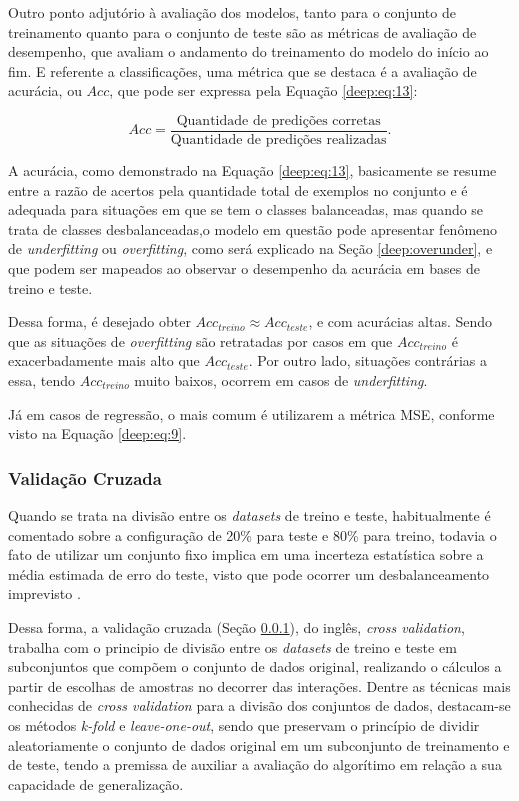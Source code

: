 Outro ponto adjutório à avaliação dos modelos, tanto para o conjunto de treinamento quanto para o conjunto de teste são as métricas de avaliação de desempenho, que avaliam o andamento do treinamento do modelo do início ao fim. E referente a classificações, uma métrica que se destaca é a avaliação de acurácia, ou $Acc$, que pode ser expressa pela Equação \ref{deep:eq:13}:

\begin{equation}
    \label{deep:eq:13}
    Acc = \frac{\text{Quantidade de predições corretas}}{\text{Quantidade de predições realizadas}}.
\end{equation}

A acurácia, como demonstrado na Equação \ref{deep:eq:13}, basicamente se resume entre a razão de acertos pela quantidade total de exemplos no conjunto e é adequada para situações em que se tem o classes balanceadas, mas quando se trata de classes desbalanceadas,o modelo em questão pode apresentar fenômeno de \textit{underfitting} ou \textit{overfitting}, como será explicado na Seção \ref{deep:overunder}, e que podem ser mapeados ao observar o desempenho da acurácia em bases de treino e teste.

Dessa forma, é desejado obter $Acc_{treino} \approx Acc_{teste}$, e com  acurácias altas. Sendo que as situações de \textit{overfitting} são retratadas por casos em que $Acc_{treino}$ é exacerbadamente mais alto que $Acc_{teste}$. Por outro lado, situações contrárias a essa, tendo $Acc_{treino}$ muito baixos, ocorrem em casos de \textit{underfitting}.

Já em casos de regressão, o mais comum é utilizarem a métrica MSE, conforme visto na Equação \ref{deep:eq:9}.


\subsubsection{Validação Cruzada}
\label{deep:cross}

Quando se trata na divisão entre os \textit{datasets} de treino e teste, habitualmente é comentado sobre a configuração de 20\% para teste e 80\% para treino, todavia o fato de utilizar um conjunto fixo implica em uma incerteza estatística sobre a média estimada de erro do teste, visto que pode ocorrer um desbalanceamento imprevisto \cite{Goodfellow2016}.

Dessa forma, a validação cruzada (Seção \ref{deep:cross}), do inglês, \textit{cross validation}, trabalha com o principio de divisão entre os \textit{datasets} de treino e teste em subconjuntos que compõem o conjunto de dados original, realizando o cálculos a partir de escolhas de amostras no decorrer das interações. Dentre as técnicas mais conhecidas de \textit{cross validation} para a divisão dos conjuntos de dados, destacam-se os métodos \textit{k-fold} e \textit{leave-one-out}, sendo que preservam o princípio de dividir aleatoriamente o conjunto de dados original em um subconjunto de treinamento e de teste, tendo a premissa de auxiliar a avaliação do algorítimo em relação a sua capacidade de generalização.

